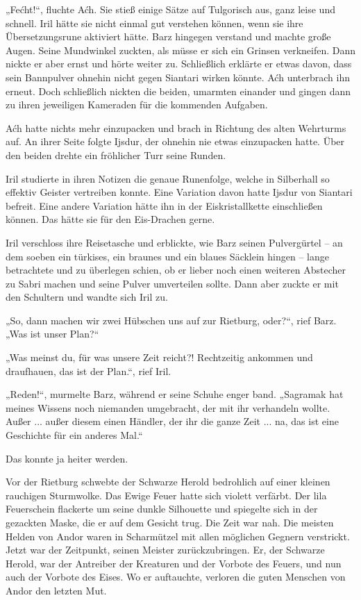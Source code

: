 „Fećht!“, fluchte Aćh. Sie stieß einige Sätze auf Tulgorisch aus, ganz leise und schnell. Iril hätte sie nicht einmal gut verstehen können, wenn sie ihre Übersetzungsrune aktiviert hätte. Barz hingegen verstand und machte große Augen. Seine Mundwinkel zuckten, als müsse er sich ein Grinsen verkneifen. Dann nickte er aber ernst und hörte weiter zu. Schließlich erklärte er etwas davon, dass sein Bannpulver ohnehin nicht gegen Siantari wirken könnte. Aćh unterbrach ihn erneut. Doch schließlich nickten die beiden, umarmten einander und gingen dann zu ihren jeweiligen Kameraden für die kommenden Aufgaben.

Aćh hatte nichts mehr einzupacken und brach in Richtung des alten Wehrturms auf. An ihrer Seite folgte Ijsdur, der ohnehin nie etwas einzupacken hatte. Über den beiden drehte ein fröhlicher Turr seine Runden.

Iril studierte in ihren Notizen die genaue Runenfolge, welche in Silberhall so effektiv Geister vertreiben konnte. Eine Variation davon hatte Ijsdur von Siantari befreit. Eine andere Variation hätte ihn in der Eiskristallkette einschließen können. Das hätte sie für den Eis-Drachen gerne.

Iril verschloss ihre Reisetasche und erblickte, wie Barz seinen Pulvergürtel – an dem soeben ein türkises, ein braunes und ein blaues Säcklein hingen – lange betrachtete und zu überlegen schien, ob er lieber noch einen weiteren Abstecher zu Sabri machen und seine Pulver umverteilen sollte. Dann aber zuckte er mit den Schultern und wandte sich Iril zu.

„So, dann machen wir zwei Hübschen uns auf zur Rietburg, oder?“, rief Barz. „Was ist unser Plan?“

„Was meinst du, für was unsere Zeit reicht?! Rechtzeitig ankommen und draufhauen, das ist der Plan.“, rief Iril.

„Reden!“, murmelte Barz, während er seine Schuhe enger band. „Sagramak hat meines Wissens noch niemanden umgebracht, der mit ihr verhandeln wollte. Außer ... außer diesem einen Händler, der ihr die ganze Zeit ... na, das ist eine Geschichte für ein anderes Mal.“

Das konnte ja heiter werden.



\trennzeichen



Vor der Rietburg schwebte der Schwarze Herold bedrohlich auf einer kleinen rauchigen Sturmwolke. Das Ewige Feuer hatte sich violett verfärbt. Der lila Feuerschein flackerte um seine dunkle Silhouette und spiegelte sich in der gezackten Maske, die er auf dem Gesicht trug. Die Zeit war nah. Die meisten Helden von Andor waren in Scharmützel mit allen möglichen Gegnern verstrickt. Jetzt war der Zeitpunkt, seinen Meister zurückzubringen. Er, der Schwarze Herold, war der Antreiber der Kreaturen und der Vorbote des Feuers, und nun auch der Vorbote des Eises. Wo er auftauchte, verloren die guten Menschen von Andor den letzten Mut.

